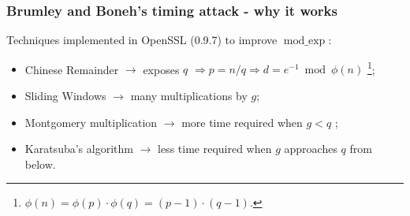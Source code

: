 \documentclass{beamer}
\DeclareMathOperator{\modexp}{mod\_exp}
\begin{document}
\begin{frame}
\frametitle{Brumley and Boneh's timing attack - why it works}

Techniques implemented in OpenSSL (0.9.7) to improve $\modexp$:
\begin{itemize}
  \item Chinese Remainder $\rightarrow$ exposes $q$ $\Rightarrow p = n / q \Rightarrow d = e^{-1} \bmod \phi(n)$ \footnote{$\phi(n) = \phi(p) \cdot \phi(q) = (p - 1) \cdot (q - 1).$};
  \item Sliding Windows \cite{bib:sliding} $\rightarrow$ many multiplications by $g$;
  \item Montgomery multiplication \cite{bib:montgomery} $\rightarrow$ more time required when $g < q$ \cite{bib:schindler};
  \item Karatsuba's algorithm $\rightarrow$ less time required when $g$ approaches $q$ from below.
\end{itemize}

\end{frame}
\end{document}
